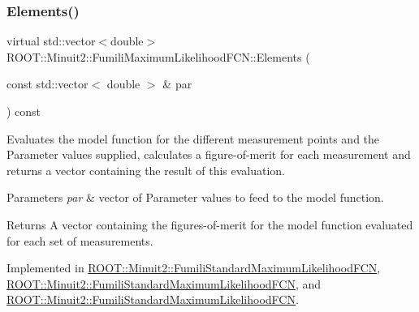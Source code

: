 \subsubsection{\texorpdfstring{Elements()}{Elements()}\hspace{0.1cm}{\footnotesize\ttfamily [3/3]}}
{\footnotesize\ttfamily virtual std\+::vector$<$double$>$ R\+O\+O\+T\+::\+Minuit2\+::\+Fumili\+Maximum\+Likelihood\+F\+C\+N\+::\+Elements (\begin{DoxyParamCaption}\item[{const std\+::vector$<$ double $>$ \&}]{par }\end{DoxyParamCaption}) const\hspace{0.3cm}{\ttfamily [pure virtual]}}

Evaluates the model function for the different measurement points and the Parameter values supplied, calculates a figure-\/of-\/merit for each measurement and returns a vector containing the result of this evaluation.


\begin{DoxyParams}{Parameters}
{\em par} & vector of Parameter values to feed to the model function.\\
\hline
\end{DoxyParams}
\begin{DoxyReturn}{Returns}
A vector containing the figures-\/of-\/merit for the model function evaluated for each set of measurements. 
\end{DoxyReturn}


Implemented in \mbox{\hyperlink{classROOT_1_1Minuit2_1_1FumiliStandardMaximumLikelihoodFCN_a19866fac44787dee8e2a6a35e7a15fe1}{R\+O\+O\+T\+::\+Minuit2\+::\+Fumili\+Standard\+Maximum\+Likelihood\+F\+CN}}, \mbox{\hyperlink{classROOT_1_1Minuit2_1_1FumiliStandardMaximumLikelihoodFCN_af104474f9095c245b467f9db554a126a}{R\+O\+O\+T\+::\+Minuit2\+::\+Fumili\+Standard\+Maximum\+Likelihood\+F\+CN}}, and \mbox{\hyperlink{classROOT_1_1Minuit2_1_1FumiliStandardMaximumLikelihoodFCN_af104474f9095c245b467f9db554a126a}{R\+O\+O\+T\+::\+Minuit2\+::\+Fumili\+Standard\+Maximum\+Likelihood\+F\+CN}}.

\mbox{\label{classROOT_1_1Minuit2_1_1FumiliMaximumLikelihoodFCN_ac3e28c8d3e14a1df3145891ae99ac35d}} 
